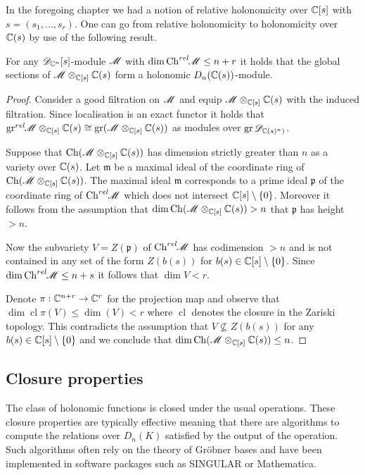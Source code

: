 In the foregoing chapter we had a notion of relative holonomicity over $\mathbb{C}[s]$ with $s = (s_1,\ldots,s_r)$.
One can go from relative holonomicity to holonomicity over $\mathbb{C}(s)$ by use of the following result.
\begin{lemma}
    For any $\mathscr{D}_{\mathbb{C}^n}[s]$-module $\mathscr{M}$ with $\dim\operatorname{Ch}^{rel}\mkern-5mu\mathscr{M}\leq n+r$ it holds that the global sections of $\mathscr{M}\otimes_{\mathbb{C}[s]}\mathbb{C}(s)$ form a holonomic $D_n(\mathbb{C}(s))$-module.
\end{lemma}
  \begin{proof}
    Consider a good filtration on $\mathscr{M}$ and equip $\mathscr{M}\otimes_{\mathbb{C}[s]}\mathbb{C}(s)$ with the induced filtration.
    Since localisation is an exact functor it holds that $\operatorname{gr}^{rel}\mkern-5mu\mathscr{M}\otimes_{\mathbb{C}[s]}\mathbb{C}(s) \cong \operatorname{gr}(\mathscr{M}\otimes_{\mathbb{C}[s]}\mathbb{C}(s)) $ as modules over $\operatorname{gr}\mathscr{D}_{\mathbb{C}(s)^n)}$.

    Suppose that $\operatorname{Ch}(\mathscr{M}\otimes_{\mathbb{C}[s]}\mathbb{C}(s))$ has dimension strictly greater than $n$ as a variety over $\mathbb{C}(s)$.
    Let $\mathfrak{m}$ be a maximal ideal of the coordinate ring of $\operatorname{Ch} (\mathscr{M}\otimes_{\mathbb{C}[s]}\mathbb{C}(s))$.
    The maximal ideal $\mathfrak{m}$ corresponds to a prime ideal $\mathfrak{p}$ of the coordinate ring of $\operatorname{Ch}^{rel}\mkern-5mu\mathscr{M}$ which does not intersect $\mathbb{C}[s]\setminus\{0\}$.
    Moreover it follows from the assumption that  $\dim\operatorname{Ch}(\mathscr{M}\otimes_{\mathbb{C}[s]}\mathbb{C}(s))> n$ that $\mathfrak{p}$ has height $>n$.

    Now the subvariety $V = Z(\mathfrak{p})$ of $\operatorname{Ch}^{rel}\mkern-5mu\mathscr{M}$ has codimension $>n$ and is not contained in any set of the form $Z(b(s))$ for $b(s)\in \mathbb{C}[s]\setminus\{0\}$.
    Since $\dim\operatorname{Ch}^{rel}\mkern-5mu\mathscr{M}\leq n+s$ it follows that $\dim V <r$.

    Denote $\pi:\mathbb{C}^{n+r}\to\mathbb{C}^r $ for the projection map and observe that $\dim\operatorname{cl}\pi(V)\leq \dim(V) < r$ where $\operatorname{cl}$ denotes the closure in the Zariski topology. %
    This contradicts the assumption that $V\nsubseteq Z(b(s))$ for any $b(s)\in \mathbb{C}[s]\setminus\{0\}$ and we conclude that $\dim \operatorname{Ch} (\mathscr{M}\otimes_{\mathbb{C}[s]}\mathbb{C}(s)) \leq n$.
    \end{proof}
    \subsection{Closure properties}
    The class of holonomic functions is closed under the usual operations.
    These closure properties are typically effective meaning that there are algorithms to compute the relations over $D_n(K)$ satisfied by the output of the operation.
    Such algorithms often rely on the theory of Gr\"obner bases and have been implemented in software packages such as SINGULAR or Mathematica.

